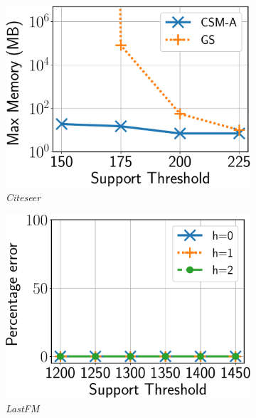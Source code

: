 %
\begin{figure}
	\vspace{4mm}
	\centering
	\begin{subfigure}[b]{0.25\textwidth}
		\includegraphics[keepaspectratio,scale=0.24]{img2/citeseer/citeseer_mem.pdf}
		\caption{{\em Citeseer}}
		\label{fig:citeseer_mem}
	\end{subfigure}%
	\begin{subfigure}[b]{0.25\textwidth}
		\includegraphics[keepaspectratio,scale=0.24, angle=0]{img2/lastfm/lastfm_spread.pdf}
		\caption{{\em LastFM}}
		\label{fig:lastfm_error}
	\end{subfigure}%
	\begin{subfigure}[b]{0.25\textwidth}

\end{subfigure}
\end{figure}

